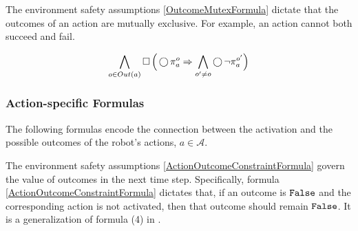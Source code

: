 The environment safety assumptions \eqref{OutcomeMutexFormula} dictate that the outcomes of an action are mutually exclusive. 
For example, an action cannot both succeed and fail.

\begin{equation}\label{OutcomeMutexFormula}
	\bigwedge \limits_{o \in Out(a)} \operatorname{\Box} \Big( \operatorname{\bigcirc} \pi_a^o \Rightarrow \bigwedge \limits_{o^\prime \neq o} \operatorname{\bigcirc} \lnot \pi_a^{o^\prime} \Big)
\end{equation}


\subsubsection{Action-specific Formulas}

The following formulas encode the connection between the activation and the possible outcomes of the robot's actions, $a \in \mathcal{A}$.

The environment safety assumptions \eqref{ActionOutcomeConstraintFormula} govern the value of outcomes in the next time step. 
Specifically, formula \eqref{ActionOutcomeConstraintFormula} dictates that, if an outcome is $\mathtt{False}$ and the corresponding action is not activated, then that outcome should remain $\mathtt{False}$.
It is a generalization of formula (4) in \cite{Vasu2013ICRA}.


